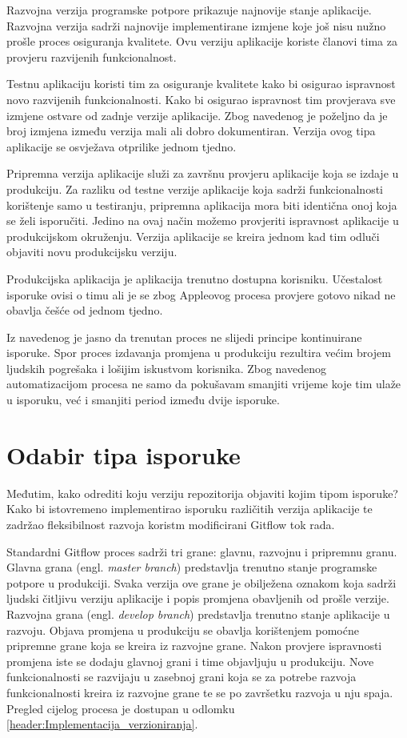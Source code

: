 \documentclass[times, utf8, diplomski, numeric]{fer}
\newcommand{\eng}[1]{(engl. \textit{#1})}
\begin{document}
Razvojna verzija programske potpore prikazuje najnovije stanje aplikacije. Razvojna verzija sadrži najnovije implementirane izmjene koje još nisu nužno prošle proces osiguranja kvalitete. Ovu verziju aplikacije koriste članovi tima za provjeru razvijenih funkcionalnost.

Testnu aplikaciju koristi tim za osiguranje kvalitete kako bi osigurao ispravnost novo razvijenih funkcionalnosti. Kako bi osigurao ispravnost tim provjerava sve izmjene ostvare od zadnje verzije aplikacije. Zbog navedenog je poželjno da je broj izmjena između verzija mali ali dobro dokumentiran. Verzija ovog tipa aplikacije se osvježava otprilike jednom tjedno.

Pripremna verzija aplikacije služi za završnu provjeru aplikacije koja se izdaje u produkciju. Za razliku od testne verzije aplikacije koja sadrži funkcionalnosti korištenje samo u testiranju, pripremna aplikacija mora biti identična onoj koja se želi isporučiti. Jedino na ovaj način možemo provjeriti ispravnost aplikacije u produkcijskom okruženju. Verzija aplikacije se kreira jednom kad tim odluči objaviti novu produkcijsku verziju.

Produkcijska aplikacija je aplikacija trenutno dostupna korisniku. Učestalost isporuke ovisi o timu ali je se zbog Appleovog procesa provjere gotovo nikad ne obavlja češće od jednom tjedno.

Iz navedenog je jasno da trenutan proces ne slijedi principe kontinuirane isporuke. Spor proces izdavanja promjena u produkciju rezultira većim brojem ljudskih pogrešaka i lošijim iskustvom korisnika. Zbog navedenog automatizacijom procesa ne samo da pokušavam smanjiti vrijeme koje tim ulaže u isporuku, već i smanjiti period između dvije isporuke.


\section{Odabir tipa isporuke}

Međutim, kako odrediti koju verziju repozitorija objaviti kojim tipom isporuke? Kako bi istovremeno implementirao isporuku različitih verzija aplikacije te zadržao fleksibilnost razvoja koristm modificirani Gitflow tok rada.

Standardni Gitflow proces sadrži tri grane: glavnu, razvojnu i pripremnu granu. Glavna grana \eng{master branch} predstavlja trenutno stanje programske potpore u produkciji. Svaka verzija ove grane je obilježena oznakom koja sadrži ljudski čitljivu verziju aplikacije i popis promjena obavljenih od prošle verzije. Razvojna grana \eng{develop branch} predstavlja trenutno stanje aplikacije u razvoju. Objava promjena u produkciju se obavlja korištenjem pomoćne pripremne grane koja se kreira iz razvojne grane. Nakon provjere ispravnosti promjena iste se dodaju glavnoj grani i time objavljuju u produkciju. Nove funkcionalnosti se razvijaju u zasebnoj grani koja se za potrebe razvoja funkcionalnosti kreira iz razvojne grane te se po završetku razvoja u nju spaja. Pregled cijelog procesa je dostupan u odlomku \ref{header:Implementacija_verzioniranja}.
\end{document}
